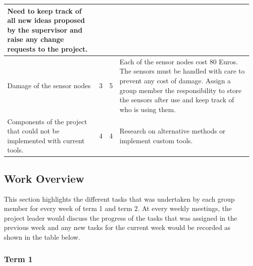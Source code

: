 \begin{center}
\begin{longtable}{| p{4cm} | l | l | p{7cm} |}
Need to keep track of all new ideas proposed by the supervisor and raise any change requests to the project.

		\\ \hline
		
	Damage of the sensor nodes
	& 3 & 5 & Each of the sensor nodes cost 80 Euros. The sensors must be handled with care to prevent any cost of damage. Assign a group member the responsibility to store the sensors after use and keep track of who is using them.
	
		\\ \hline
		
	Components of the project that could not be implemented with current tools.
	& 4 & 4 & Research on alternative methods or implement custom tools.
	\\ \hline		
		
	\end{longtable}

\end{center}

\subsection{Work Overview}

This section highlights the different tasks that was undertaken by each group member for every week of term 1 and term 2. At every weekly meetings, the project leader would discuss the progress of the tasks that was assigned in the previous week and any new tasks for the current week would be recorded as shown in the table below.

\subsubsection*{Term 1}

